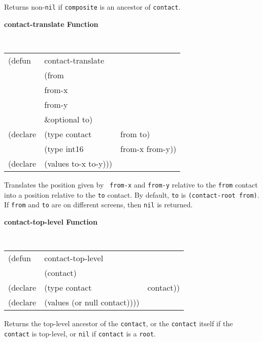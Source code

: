 \begin{flushright} \parbox[t]{6.125in}{
Returns non-{\tt nil} if {\tt composite} is an ancestor of {\tt contact}.

}\end{flushright}

{\samepage
{\large {\bf contact-translate \hfill Function}} 
\begin{flushright} 
\parbox[t]{6.125in}{
\tt
\begin{tabular}{lll}
\raggedright
(defun & contact-translate & \\ 
& (from \\
&  from-x \\
&  from-y \\
&  \&optional to) \\
(declare &(type contact & from to) \\
         &(type int16   & from-x from-y))\\
(declare &(values to-x to-y)))
\end{tabular}
\rm

}\end{flushright}}

\begin{flushright} \parbox[t]{6.125in}{ Translates the position given by {\tt
from-x} and {\tt from-y} relative to the {\tt from} contact into a position
relative to the {\tt to} contact.  By default, {\tt to} is {\tt (contact-root
from)}.  If {\tt from} and {\tt to} are on different screens, then {\tt nil} is
returned.

}\end{flushright}

{\samepage
{\large {\bf contact-top-level \hfill Function}} 
\begin{flushright} 
\parbox[t]{6.125in}{
\tt
\begin{tabular}{lll}
\raggedright
(defun & contact-top-level & \\ 
& (contact) \\
(declare &(type contact & contact))\\
(declare &(values (or null contact))))
\end{tabular}
\rm

}\end{flushright}}

\begin{flushright} \parbox[t]{6.125in}{
Returns the top-level ancestor of the {\tt contact}, or the {\tt contact} itself
if the {\tt contact} is top-level, or {\tt nil} if {\tt contact} is a {\tt root}. 

}\end{flushright}



